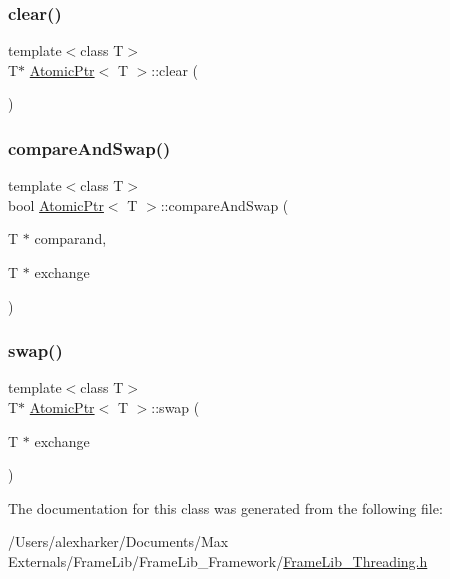 \subsubsection{\texorpdfstring{clear()}{clear()}}
{\footnotesize\ttfamily template$<$class T$>$ \\
T$\ast$ \hyperlink{class_atomic_ptr}{Atomic\+Ptr}$<$ T $>$\+::clear (\begin{DoxyParamCaption}{ }\end{DoxyParamCaption})\hspace{0.3cm}{\ttfamily [inline]}}

\mbox{\label{class_atomic_ptr_a553945e2bd92ac404262a6e9f2c31590}} 
\subsubsection{\texorpdfstring{compare\+And\+Swap()}{compareAndSwap()}}
{\footnotesize\ttfamily template$<$class T$>$ \\
bool \hyperlink{class_atomic_ptr}{Atomic\+Ptr}$<$ T $>$\+::compare\+And\+Swap (\begin{DoxyParamCaption}\item[{T $\ast$}]{comparand,  }\item[{T $\ast$}]{exchange }\end{DoxyParamCaption})\hspace{0.3cm}{\ttfamily [inline]}}

\mbox{\label{class_atomic_ptr_a45b46112ae64d355062bf823e19f0f5c}} 
\subsubsection{\texorpdfstring{swap()}{swap()}}
{\footnotesize\ttfamily template$<$class T$>$ \\
T$\ast$ \hyperlink{class_atomic_ptr}{Atomic\+Ptr}$<$ T $>$\+::swap (\begin{DoxyParamCaption}\item[{T $\ast$}]{exchange }\end{DoxyParamCaption})\hspace{0.3cm}{\ttfamily [inline]}}



The documentation for this class was generated from the following file\+:\begin{DoxyCompactItemize}
\item 
/\+Users/alexharker/\+Documents/\+Max Externals/\+Frame\+Lib/\+Frame\+Lib\+\_\+\+Framework/\hyperlink{_frame_lib___threading_8h}{Frame\+Lib\+\_\+\+Threading.\+h}\end{DoxyCompactItemize}
